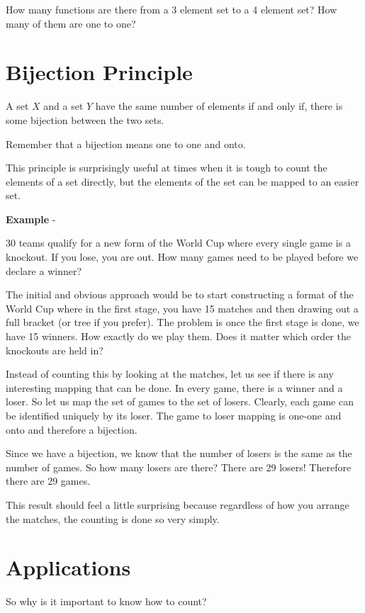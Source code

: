 \documentclass[12pt]{article}
\begin{document}
How many functions are there from a 3 element set to a 4 element set? How many of them are one to one?

\section*{Bijection Principle}
A set $X$ and a set $Y$ have the same number of elements if and only if, there is some bijection between the two sets. 

Remember that a bijection means one to one and onto. 

This principle is surprisingly useful at times when it is tough to count the elements of a set directly, but the elements of the set can be mapped to an easier set. 

\textbf{Example} - 

30 teams qualify for a new form of the World Cup where every single game is a knockout. If you lose, you are out. How many games need to be played before we declare a winner?

The initial and obvious approach would be to start constructing a format of the World Cup where in the first stage, you have 15 matches and then drawing out a full bracket (or tree if you prefer). The problem is once the first stage is done, we have 15 winners. How exactly do we play them. Does it matter which order the knockouts are held in?

Instead of counting this by looking at the matches, let us see if there is any interesting mapping that can be done. In every game, there is a winner and a loser. So let us map the set of games to the set of losers. Clearly, each game can be identified uniquely by its loser. The game to loser mapping is one-one and onto and therefore a bijection. 

Since we have a bijection, we know that the number of losers is the same as the number of games. So how many losers are there? There are 29 losers! Therefore there are 29 games.

This result should feel a little surprising because regardless of how you arrange the matches, the counting is done so very simply.


\section*{Applications}
So why is it important to know how to count?
\end{document}
